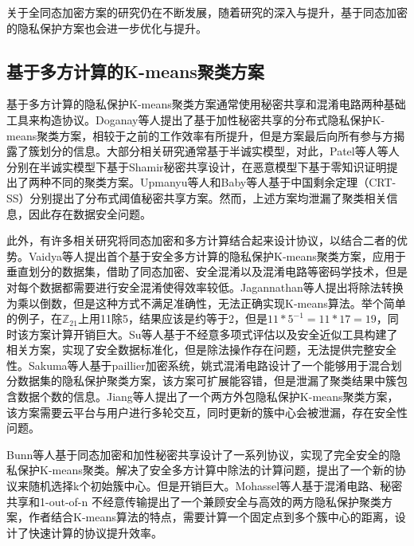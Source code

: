关于全同态加密方案的研究仍在不断发展，随着研究的深入与提升，基于同态加密的隐私保护方案也会进一步优化与提升。

\subsection{基于多方计算的K-means聚类方案}
基于多方计算的隐私保护K-means聚类方案通常使用秘密共享和混淆电路两种基础工具来构造协议。Doganay等人\cite{doganay2008distributed}提出了基于加性秘密共享的分布式隐私保护K-means聚类方案，相较于之前的工作效率有所提升，但是方案最后向所有参与方揭露了簇划分的信息。大部分相关研究通常基于半诚实模型，对此，Patel等人\cite{patel2012efficient,patel2013privacy}等人分别在半诚实模型下基于Shamir秘密共享设计，在恶意模型下基于零知识证明提出了两种不同的聚类方案。Upmanyu等人\cite{upmanyu2010efficient}和Baby等人\cite{baby2016distributed}基于中国剩余定理（CRT-SS）分别提出了分布式阈值秘密共享方案。然而，上述方案均泄漏了聚类相关信息，因此存在数据安全问题\cite{hegde2021sok}。

此外，有许多相关研究将同态加密和多方计算结合起来设计协议，以结合二者的优势。Vaidya等人\cite{vaidya2003privacy}提出首个基于安全多方计算的隐私保护K-means聚类方案\cite{meskine2012privacy}，应用于垂直划分的数据集，借助了同态加密、安全混淆\cite{du2001privacy}以及混淆电路等密码学技术，但是对每个数据都需要进行安全混淆使得效率较低。Jagannathan等人\cite{jagannathan2005privacy}提出将除法转换为乘以倒数，但是这种方式不满足准确性，无法正确实现K-means算法。举个简单的例子，在$\mathbb{Z}_{21}$上用11除5，结果应该是约等于2，但是$11*5^{-1}=11*17=19$，同时该方案计算开销巨大\cite{bunn2007secure}。Su等人\cite{su2007privacy}基于不经意多项式评估以及安全近似工具构建了相关方案，实现了安全数据标准化，但是除法操作存在问题，无法提供完整安全性。Sakuma等人\cite{sakuma2010large}基于paillier加密系统，姚式混淆电路设计了一个能够用于混合划分数据集的隐私保护聚类方案，该方案可扩展能容错，但是泄漏了聚类结果中簇包含数据个数的信息。Jiang等人\cite{jiang2020efficient}提出了一个两方外包隐私保护K-means聚类方案，该方案需要云平台与用户进行多轮交互，同时更新的簇中心会被泄漏，存在安全性问题。

Bunn等人\cite{bunn2007secure}基于同态加密和加性秘密共享设计了一系列协议，实现了完全安全的隐私保护K-means聚类。解决了安全多方计算中除法的计算问题，提出了一个新的协议来随机选择k个初始簇中心。但是开销巨大。Mohassel等人\cite{mohassel2019practical}基于混淆电路、秘密共享和1-out-of-n 不经意传输提出了一个兼顾安全与高效的两方隐私保护聚类方案，作者结合K-means算法的特点，需要计算一个固定点到多个簇中心的距离，设计了快速计算的协议提升效率。

